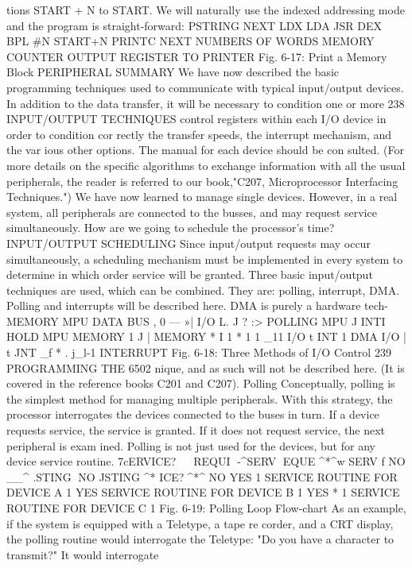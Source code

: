 \documentclass{book}
\begin{document}
tions START + N to START.
We will naturally use the indexed addressing mode and the
program is straight-forward:
PSTRING
NEXT
LDX
LDA
JSR
DEX
BPL
#N
START+N
PRINTC
NEXT
NUMBERS OF WORDS
MEMORY
COUNTER
OUTPUT REGISTER
TO PRINTER
Fig. 6-17: Print a Memory Block
PERIPHERAL SUMMARY
We have now described the basic programming techniques used
to communicate with typical input/output devices. In addition to
the data transfer, it will be necessary to condition one or more
238
INPUT/OUTPUT TECHNIQUES
control registers within each I/O device in order to condition cor
rectly the transfer speeds, the interrupt mechanism, and the var
ious other options. The manual for each device should be con
sulted. (For more details on the specific algorithms to exchange
information with all the usual peripherals, the reader is referred
to our book,"C207, Microprocessor Interfacing Techniques.")
We have now learned to manage single devices. However, in a
real system, all peripherals are connected to the busses, and may
request service simultaneously. How are we going to schedule the
processor's time?
INPUT/OUTPUT SCHEDULING
Since input/output requests may occur simultaneously, a
scheduling mechanism must be implemented in every system to
determine in which order service will be granted. Three basic
input/output techniques are used, which can be combined.
They are: polling, interrupt, DMA. Polling and interrupts
will be described here. DMA is purely a hardware tech-
MEMORY
MPU
DATA BUS
, 0
— »| I/O
L.
J ?
:> POLLING
MPU
J
INTI
HOLD
MPU
MEMORY
1
J
| MEMORY
* I 1 *
1 1 _11
I/O
t INT
1
DMA
I/O |
t JNT
_f * .
j_l-1
INTERRUPT
Fig. 6-18: Three Methods of I/O Control
239
PROGRAMMING THE 6502
nique, and as such will not be described here. (It is covered in
the reference books C201 and C207).
Polling
Conceptually, polling is the simplest method for managing multiple
peripherals. With this strategy, the processor interrogates the devices
connected to the buses in turn. If a device requests service, the service
is granted. If it does not request service, the next peripheral is exam
ined. Polling is not just used for the devices, but for any device service
routine.
^^wcERVICE? ^^^
^^^ REQUI
^^^-^SERV
^^REQUE
^*^w SERV
f
NO
__^
.STING^^V
NO
^^
STING ^*
ICE?^^^^*^
NO
YES
1
SERVICE ROUTINE
FOR DEVICE A
1
YES
SERVICE ROUTINE
FOR DEVICE B
1
YES
* 1
SERVICE ROUTINE
FOR DEVICE C
1
Fig. 6-19: Polling Loop Flow-chart
As an example, if the system is equipped with a Teletype, a tape re
corder, and a CRT display, the polling routine would interrogate the
Teletype: "Do you have a character to transmit?" It would interrogate
\end{document}
